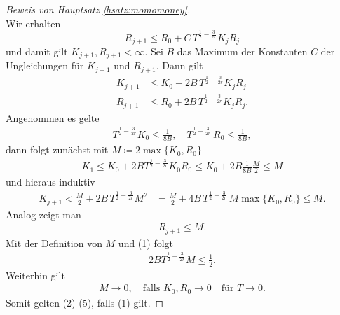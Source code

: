 \begin{proof}[Beweis von Hauptsatz \ref{hsatz:momomoney}]
$$  $$
  Wir erhalten
  $$
  R_{j + 1} \leq R_0 + C\, T^{\frac{1}{2} - \frac{3}{2r}} K_j R_j
  $$
  und damit gilt $K_{j + 1}, R_{j + 1} < \infty$.
  Sei $B$ das Maximum der Konstanten $C$ der Ungleichungen für $K_{j + 1}$ und $R_{j + 1}$.
  Dann gilt
  \begin{align*}
    K_{j + 1} &\leq K_0 + 2 B\, T^{\frac{1}{2} - \frac{3}{2r}} K_j R_j \\
    R_{j + 1} &\leq R_0 + 2 B\, T^{\frac{1}{2} - \frac{3}{2r}} K_j R_j.
  \end{align*}
  Angenommen es gelte
  \begin{align}
    T^{\frac{1}{2} - \frac{3}{2r}} K_0 \leq \frac{1}{8B}, \quad T^{\frac{1}{2} - \frac{3}{2r}} \, R_0 \leq \frac{1}{8B},
  \end{align}
  dann folgt zunächst mit $M \coloneqq 2 \max \{ K_0, R_0 \}$ 
  \begin{align*}
    K_1 \leq K_0 + 2 B T^{\frac{1}{2} - \frac{3}{2r}} K_0 R_0 \leq K_0 + 2 B \frac{1}{8B} \frac{M}{2} \leq M
  \end{align*}
  und hieraus induktiv
  \begin{align}
    K_{j + 1} < \frac{M}{2} + 2 B\, T^{\frac{1}{2} - \frac{3}{2r}} M^2
    &= \frac{M}{2} + 4 B\, T^{\frac{1}{2} - \frac{3}{2r}} \, M \max\{K_0, R_0\}
    \leq M.
  \end{align}
  Analog zeigt man 
  \begin{align}
    R_{j + 1} \leq M.
  \end{align}
  Mit der Definition von $M$ und (1) folgt
  \begin{align}
    2 B T^{\frac{1}{2} - \frac{3}{2r}} M \leq \frac{1}{2}.
  \end{align}
  Weiterhin gilt
  \begin{align}
    M \to 0, \quad\text{falls } K_0, R_0 \to 0 \quad\text{für } T \to 0.
  \end{align}
  Somit gelten (2)-(5), falls (1) gilt.


\end{proof}
